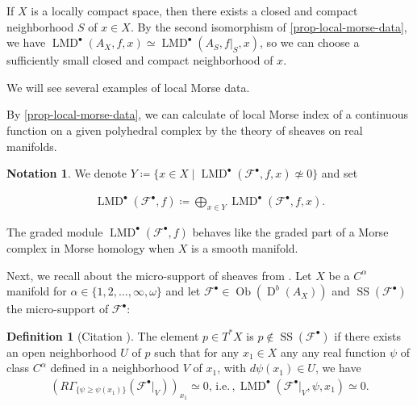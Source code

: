 \documentclass[a4paper,dvipdfmx,reqno,12pt]{amsart}
\theoremstyle{definition}
\newtheorem{definition}[theorem]{Definition}
\newtheorem{notation}[theorem]{Notation}
\newcommand{\deq}{\coloneqq}
\newcommand{\mcal}[1]{\mathcal{#1}}%
\newcommand{\opn}[1]{\operatorname{#1}}
\numberwithin{equation}{section}
\begin{document}
If $X$ is a locally compact space, then there exists a 
closed and compact neighborhood $S$ of $x\in X$. 
By the second isomorphism of \cref{prop-local-morse-data},
we have 
$\opn{LMD}^{\bullet}(A_X,f,x)\simeq 
\opn{LMD}^{\bullet}(A_S,f|_S,x)$, so 
we can choose a sufficiently small closed and 
compact neighborhood 
of $x$. 



We will see several examples of local Morse data.






By \cref{prop-local-morse-data}, we can calculate
of local Morse index of a continuous function on 
a given polyhedral complex by the theory of sheaves on 
real manifolds.

\begin{notation}

We denote $Y\deq 
\{x\in X\mid \opn{LMD}^{\bullet}(\mathcal{F}^{\bullet},f,x)
\not \simeq 0\}$ and set

\begin{align}
\opn{LMD}^{\bullet}(\mathcal{F}^{\bullet},f)\deq 
\bigoplus_{x\in Y}
\opn{LMD}^{\bullet}(\mathcal{F}^{\bullet},f,x).
\end{align}
\end{notation}

The graded module $\opn{LMD}^{\bullet}(\mathcal{F}^{\bullet},f)$
behaves like the graded part of a Morse complex in Morse 
homology when $X$ is a smooth manifold.

Next, we recall about the micro-support of sheaves 
from \cite{MR1299726}.
Let $X$ be a $C^{\alpha}$ manifold for
$\alpha\in\{1,2,\ldots,\infty,\omega\}$ and let
$\mcal{F}^{\bullet}\in\opn{Ob}(\opn{D}^{b}(A_X))$ and
$\opn{SS}(\mcal{F}^{\bullet})$ 
the micro-support of $\mcal{F}^{\bullet}$:
\begin{definition}[{Citation 
\cite[Definition 5.1.2]{MR1299726}}]
The element $p\in T^{*}X$ 
is  $p\notin \opn{SS}(\mathcal{F}^{\bullet})$
if there exists an open neighborhood $U$ of $p$ such 
that for any $x_1\in X$ any any real 
function $\psi$ of class $C^{\alpha}$ defined 
in a neighborhood $V$ of $x_1$, with 
$d\psi(x_1)\in U$, we have
\begin{align}
(R\Gamma_{\{\psi \geq \psi(x_1)\}}(\mathcal{F}^{\bullet}|_V))_{x_1}
\simeq 0,\, \mathrm{i.e.} \, , 
\opn{LMD}^{\bullet}(\mathcal{F}^{\bullet}|_V,\psi,x_1)
\simeq 0.
\end{align}

\end{definition}
\end{document}
